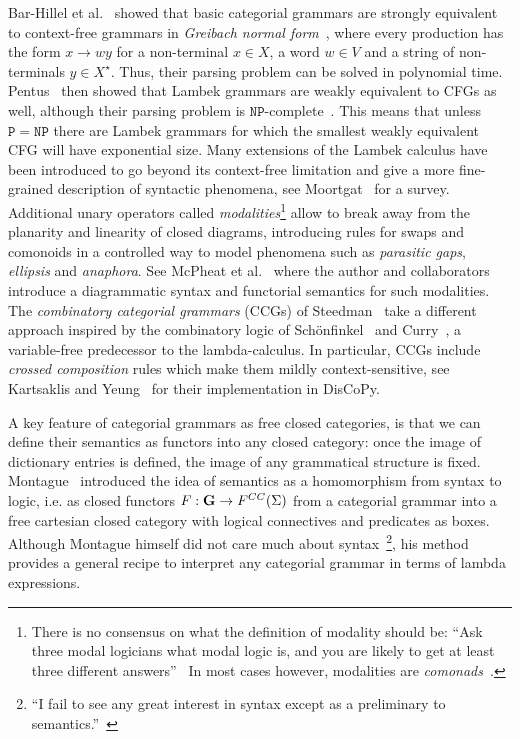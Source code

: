 Bar-Hillel et al.~\cite{Bar-HillelEtAl60} showed that basic categorial grammars are strongly equivalent to context-free grammars in \emph{Greibach normal form}~\cite{Greibach65}, where every production has the form $x \to w y$ for a non-terminal $x \in X$, a word $w \in V$ and a string of non-terminals $y \in X^\star$.
Thus, their parsing problem can be solved in polynomial time.
Pentus~\cite{Pentus93} then showed that Lambek grammars are weakly equivalent to CFGs as well, although their parsing problem is $\mathtt{NP}$-complete~\cite{Pentus06}.
This means that unless $\mathtt{P} = \mathtt{NP}$ there are Lambek grammars for which the smallest weakly equivalent CFG will have exponential size.
Many extensions of the Lambek calculus have been introduced to go beyond its context-free limitation and give a more fine-grained description of syntactic phenomena, see Moortgat~\cite{Moortgat14} for a survey.
Additional unary operators called \emph{modalities}\footnote
{There is no consensus on what the definition of modality should be: ``Ask three modal logicians what modal logic is, and you are likely to get at least three different answers''~\cite{BlackburnEtAl02}
In most cases however, modalities are \emph{comonads}~\cite{CirsteaEtAl11}.} allow to break away from the planarity and linearity of closed diagrams, introducing rules for swaps and comonoids in a controlled way to model phenomena such as \emph{parasitic gaps}, \emph{ellipsis} and \emph{anaphora}.
See McPheat et al.~\cite{McPheatEtAl21} where the author and collaborators introduce a diagrammatic syntax and functorial semantics for such modalities.
The \emph{combinatory categorial grammars} (CCGs) of Steedman~\cite{Steedman87,Steedman00} take a different approach inspired by the combinatory logic of Schönfinkel~\cite{Schonfinkel24} and Curry~\cite{Curry30}, a variable-free predecessor to the lambda-calculus.
In particular, CCGs include \emph{crossed composition} rules which make them mildly context-sensitive, see Kartsaklis and Yeung~\cite{YeungKartsaklis21} for their implementation in DisCoPy.

A key feature of categorial grammars as free closed categories, is that we can define their semantics as functors into any closed category: once the image of dictionary entries is defined, the image of any grammatical structure is fixed.
Montague~\cite{Montague70a,Montague70,Montague73} introduced the idea of semantics as a homomorphism from syntax to logic, i.e. as closed functors $F : \mathbf{G} \to F^{CC}(\Sigma)$ from a categorial grammar into a free cartesian closed category with logical connectives and predicates as boxes.
Although Montague himself did not care much about syntax~\footnote
{``I fail to see any great interest in syntax except as a preliminary to semantics.''~\cite{Montague70a}},
his method provides a general recipe to interpret any categorial grammar in terms of lambda expressions.

